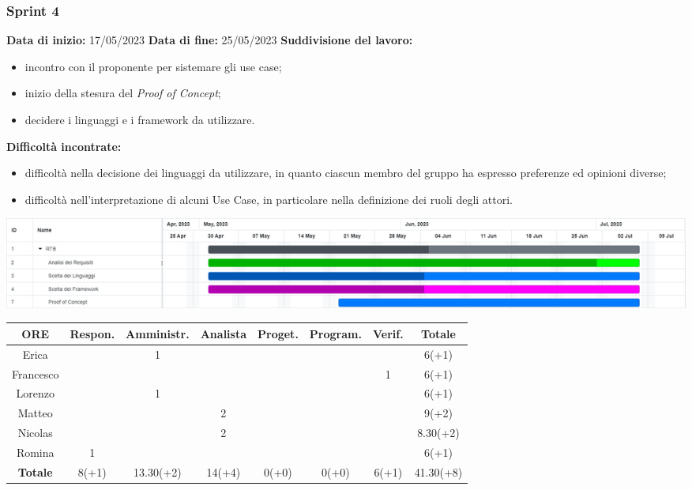 \documentclass[a4paper, 12pt]{article}
\begin{document}
\subsubsection{Sprint 4}
\textbf{Data di inizio:} 17/05/2023\newline
\textbf{Data di fine:} 25/05/2023\newline
\newline
\textbf{Suddivisione del lavoro:}
\begin{itemize}
    \item incontro con il proponente per sistemare gli use case;
    \item inizio della stesura del \textit{Proof of Concept};
    \item decidere i linguaggi e i framework da utilizzare.
\end{itemize}
\textbf{Difficoltà incontrate:}
\begin{itemize}
    \item difficoltà nella decisione dei linguaggi da utilizzare, in quanto
    ciascun membro del gruppo ha espresso preferenze ed opinioni diverse;
    \item difficoltà nell'interpretazione di alcuni Use Case, in particolare
    nella definizione dei ruoli degli attori. 
\end{itemize}
\includegraphics[scale=0.24]{RTB_3.png}\newline
\newline
\begin{tabular}{|c|c|c|c|c|c|c|c|}
    \hline
    \textbf{ORE} & \textbf{Respon.} & \textbf{Amministr.} & \textbf{Analista} & \textbf{Proget.} & \textbf{Program.} & \textbf{Verif.} & \textbf{Totale}\\
    \hline
    Erica & & 1 & & & & & 6(+1)\\
    \hline
    Francesco & & & & & & 1 & 6(+1)\\
    \hline
    Lorenzo & & 1 & & & & & 6(+1)\\
    \hline
    Matteo & & & 2 & & & & 9(+2)\\
    \hline
    Nicolas & & & 2 & & & & 8.30(+2)\\
    \hline
    Romina & 1 & & & & & & 6(+1)\\
    \hline
    \textbf{Totale} & 8(+1) & 13.30(+2) & 14(+4) & 0(+0) & 0(+0) & 6(+1) & 41.30(+8)\\
    \hline
\end{tabular}\\[8pt]
\end{document}
